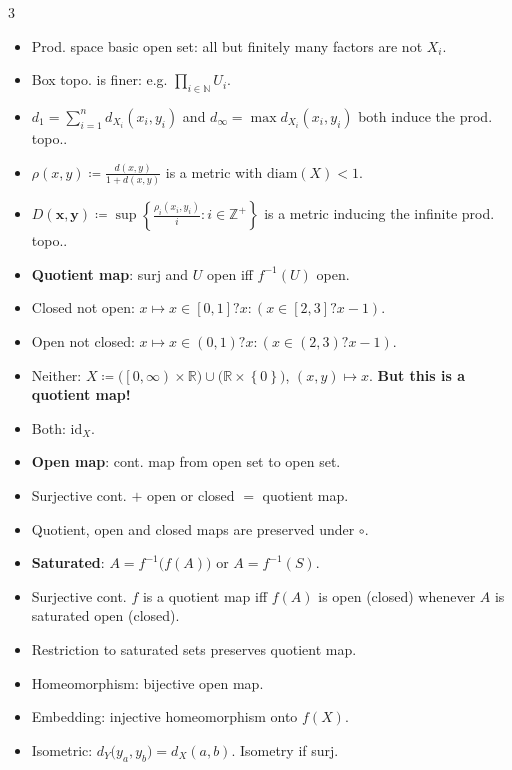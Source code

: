 \documentclass[10pt]{article}
\newcommand{\R}{\mathbb{R}} %
\newcommand{\N}{\mathbb{N}} %
\newcommand{\Z}{\mathbb{Z}} %
\begin{document}
\begin{multicols*}{3}
\begin{itemize}
            \item Prod. space basic open set: all but finitely many factors are not $X_i$.
            \item Box topo. is finer: e.g. $\prod_{i \in \N}U_i$.
            \item $d_1 = \sum_{i = 1}^n d_{X_i}\left(x_i, y_i\right)$ and $d_{\infty} = \max d_{X_i}\left(x_i, y_i\right)$ both induce the prod. topo..
            \item $\rho\left(x, y\right) \coloneqq \frac{d\left(x, y\right)}{1 + d\left(x, y\right)}$ is a metric with $\mathrm{diam}\left(X\right) < 1$. 
            \item $D\left(\bm{x}, \bm{y}\right) \coloneqq \sup \left\{\frac{\rho_{i}\left(x_i, y_i\right)}{i} \colon i \in \Z^+\right\}$ is a metric inducing the infinite prod. topo..
            \item \textbf{Quotient map}: surj and $U$ open iff $f^{-1}\left(U\right)$ open.
            \item Closed not open: $x \mapsto x \in [0, 1] ? x : \left(x \in [2, 3] ? x - 1\right)$.
            \item Open not closed: $x \mapsto x \in (0, 1) ? x : \left(x \in (2, 3) ? x - 1\right)$.
            \item Neither: $X \coloneqq \bigl(\left[0, \infty\right) \times \R\bigr) \cup \bigl(\R \times \left\{0\right\}\bigr)$, $(x, y) \mapsto x$. \textbf{But this is a quotient map!}
            \item Both: $\mathrm{id}_X$.
            \item \textbf{Open map}: cont. map from open set to open set.
            \item Surjective cont. $+$ open or closed $=$ quotient map.
            \item Quotient, open and closed maps are preserved under $\circ$.
            \item \textbf{Saturated}: $A = f^{-1}\bigl(f\left(A\right)\bigr)$ or $A = f^{-1}\left(S\right)$.
            \item Surjective cont. $f$ is a quotient map iff $f\left(A\right)$ is open (closed) whenever $A$ is saturated open (closed).
            \item Restriction to saturated sets preserves quotient map.
            \item Homeomorphism: bijective open map.
            \item Embedding: injective homeomorphism onto $f\left(X\right)$.
            \item Isometric: $d_Y\bigl(y_a, y_b\bigr) = d_X\left(a, b\right)$. Isometry if surj.

\end{itemize}
\end{multicols*}
\end{document}
